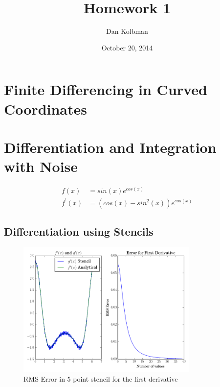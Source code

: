 \documentclass[12pt]{article}
\title{Homework 1}
\author{Dan Kolbman}
\date{October 20, 2014}
\begin{document}
  
  \maketitle

 
  \section{Finite Differencing in Curved Coordinates}

  \section{Differentiation and Integration with Noise}


  \begin{align}
    f(x) &= sin(x)e^{cos(x)} \\
    f^{\prime}(x) &= (cos(x)-sin^2(x))e^{cos(x)}
  \end{align}

  \subsection{Differentiation using Stencils}
  \begin{figure}[h!]
    \centering
    \includegraphics[width=0.8\textwidth]{Problem2ia.png}
    \caption{RMS Error in 5 point stencil for the first derivative}
  \end{figure}
\end{document}
